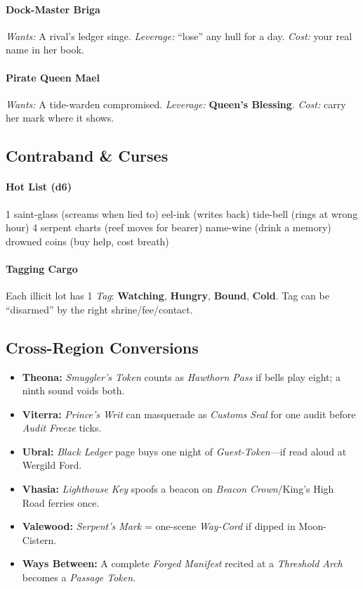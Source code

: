 \paragraph{Dock-Master Briga}
\emph{Wants:} A rival’s ledger singe. \quad \emph{Leverage:} “lose” any hull for a day. \quad \emph{Cost:} your real name in her book.

\paragraph{Pirate Queen Mael}
\emph{Wants:} A tide-warden compromised. \quad \emph{Leverage:} \textbf{Queen’s Blessing}. \quad \emph{Cost:} carry her mark where it shows.

\subsection*{Contraband \& Curses}

\paragraph{Hot List (d6)}
1 saint-glass (screams when lied to)  eel-ink (writes back)  tide-bell (rings at wrong hour)  
4 serpent charts (reef moves for bearer)  name-wine (drink a memory)  drowned coins (buy help, cost breath)

\paragraph{Tagging Cargo}
Each illicit lot has 1 \emph{Tag}: \textbf{Watching}, \textbf{Hungry}, \textbf{Bound}, \textbf{Cold}. Tag can be “disarmed” by the right shrine/fee/contact.

\subsection*{Cross-Region Conversions}

\begin{itemize}
\item \textbf{Theona:} \emph{Smuggler’s Token} counts as \emph{Hawthorn Pass} if bells play eight; a ninth sound voids both.
\item \textbf{Viterra:} \emph{Prince’s Writ} can masquerade as \emph{Customs Seal} for one audit before \emph{Audit Freeze} ticks.
\item \textbf{Ubral:} \emph{Black Ledger} page buys one night of \emph{Guest-Token}—if read aloud at Wergild Ford.
\item \textbf{Vhasia:} \emph{Lighthouse Key} spoofs a beacon on \emph{Beacon Crown}/King’s High Road ferries once.
\item \textbf{Valewood:} \emph{Serpent’s Mark} = one-scene \emph{Way-Cord} if dipped in Moon-Cistern.
\item \textbf{Ways Between:} A complete \emph{Forged Manifest} recited at a \emph{Threshold Arch} becomes a \emph{Passage Token}.
\end{itemize}

